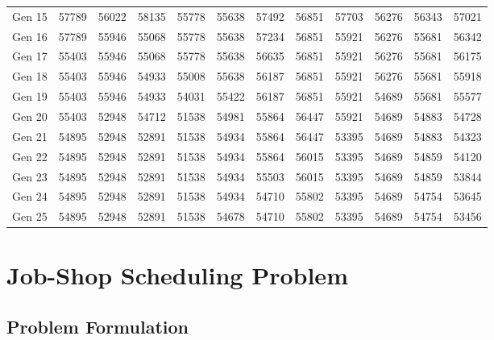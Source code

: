 \documentclass[12pt]{article}
\begin{document}
\begin{table}[h]
\begin{adjustbox}{max width=0.7\textwidth}
\begin{tabular}{*{12}{c}}
            Gen 15 & 57789 & 56022 & 58135 & 55778 & 55638 & 57492 & 56851 & 57703 & 56276 & 56343 & 57021 \\
            Gen 16 & 57789 & 55946 & 55068 & 55778 & 55638 & 57234 & 56851 & 55921 & 56276 & 55681 & 56342 \\
            Gen 17 & 55403 & 55946 & 55068 & 55778 & 55638 & 56635 & 56851 & 55921 & 56276 & 55681 & 56175 \\
            Gen 18 & 55403 & 55946 & 54933 & 55008 & 55638 & 56187 & 56851 & 55921 & 56276 & 55681 & 55918 \\
            Gen 19 & 55403 & 55946 & 54933 & 54031 & 55422 & 56187 & 56851 & 55921 & 54689 & 55681 & 55577 \\
            Gen 20 & 55403 & 52948 & 54712 & 51538 & 54981 & 55864 & 56447 & 55921 & 54689 & 54883 & 54728 \\
            Gen 21 & 54895 & 52948 & 52891 & 51538 & 54934 & 55864 & 56447 & 53395 & 54689 & 54883 & 54323 \\
            Gen 22 & 54895 & 52948 & 52891 & 51538 & 54934 & 55864 & 56015 & 53395 & 54689 & 54859 & 54120 \\
            Gen 23 & 54895 & 52948 & 52891 & 51538 & 54934 & 55503 & 56015 & 53395 & 54689 & 54859 & 53844 \\
            Gen 24 & 54895 & 52948 & 52891 & 51538 & 54934 & 54710 & 55802 & 53395 & 54689 & 54754 & 53645 \\
            Gen 25 & 54895 & 52948 & 52891 & 51538 & 54678 & 54710 & 55802 & 53395 & 54689 & 54754 & 53456 \\
            \bottomrule
        \end{tabular}
    \end{adjustbox}
\end{table}

\section{Job-Shop Scheduling Problem}

\subsection{Problem Formulation}
\end{document}
